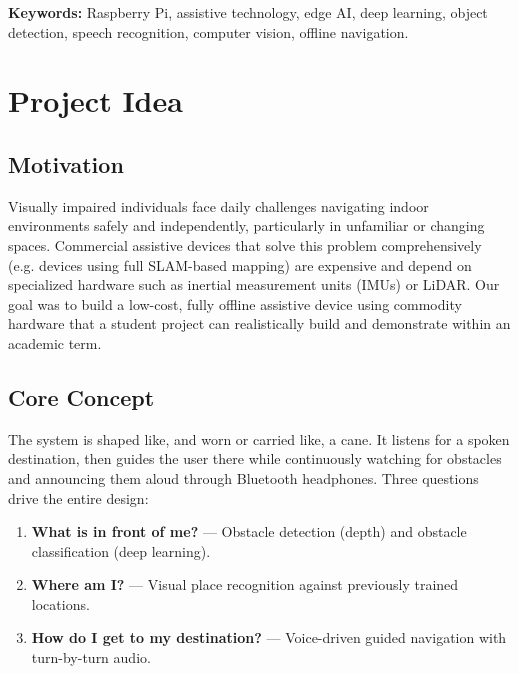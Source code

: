 \documentclass[12pt,a4paper]{article}
\begin{document}
\vspace{0.5cm}
\noindent\textbf{Keywords:} Raspberry Pi, assistive technology, edge AI, deep learning, object detection, speech recognition, computer vision, offline navigation.

\vspace{1cm}
\tableofcontents

\newpage

\section{Project Idea}

\subsection{Motivation}
Visually impaired individuals face daily challenges navigating indoor environments safely and independently, particularly in unfamiliar or changing spaces. Commercial assistive devices that solve this problem comprehensively (e.g. devices using full SLAM-based mapping) are expensive and depend on specialized hardware such as inertial measurement units (IMUs) or LiDAR. Our goal was to build a low-cost, fully offline assistive device using commodity hardware that a student project can realistically build and demonstrate within an academic term.

\subsection{Core Concept}
The system is shaped like, and worn or carried like, a cane. It listens for a spoken destination, then guides the user there while continuously watching for obstacles and announcing them aloud through Bluetooth headphones. Three questions drive the entire design:

\begin{enumerate}[leftmargin=1.4cm]
  \item \textbf{What is in front of me?} — Obstacle detection (depth) and obstacle classification (deep learning).
  \item \textbf{Where am I?} — Visual place recognition against previously trained locations.
  \item \textbf{How do I get to my destination?} — Voice-driven guided navigation with turn-by-turn audio.
\end{enumerate}
\end{document}
